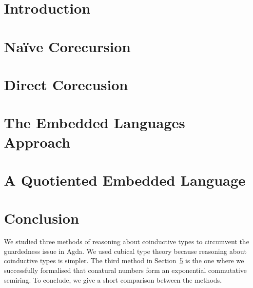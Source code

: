 \documentclass[sigplan, screen, natbib=false]{acmart}
\begin{document}

\maketitle

\section{Introduction}\label{sec:intro}


\section{Naïve Corecursion}\label{sec:problem}



\section{Direct Corecusion}\label{sec:direct}



\section{The Embedded Languages Approach}\label{sec:dsl}



\section{A Quotiented Embedded Language}\label{sec:quotiented}



\section{Conclusion}

We studied three methods of reasoning about coinductive types to circumvent the
guardedness issue in Agda. We used cubical type theory because reasoning about
coinductive types is simpler. The third method in Section~\ref{sec:quotiented}
is the one where we successfully formalised that conatural numbers form an
exponential commutative semiring. To conclude, we give a short comparison
between the methods.
\end{document}
